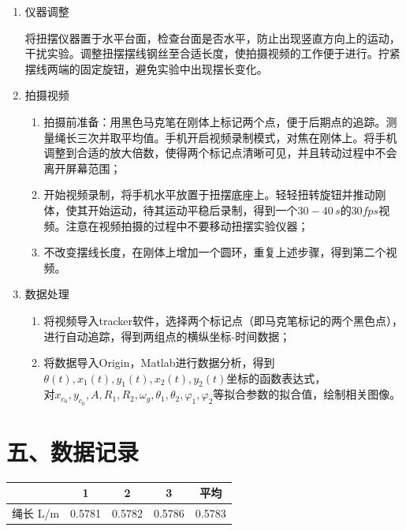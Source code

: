 \documentclass[11pt]{article}
\begin{document}
\begin{enumerate}
    \item 仪器调整
    
    将扭摆仪器置于水平台面，检查台面是否水平，防止出现竖直方向上的运动，干扰实验。调整扭摆摆线钢丝至合适长度，使拍摄视频的工作便于进行。拧紧摆线两端的固定旋钮，避免实验中出现摆长变化。

    \item 拍摄视频
    
    \begin{enumerate}
        \item 拍摄前准备：用黑色马克笔在刚体上标记两个点，便于后期点的追踪。测量绳长三次并取平均值。手机开启视频录制模式，对焦在刚体上。将手机调整到合适的放大倍数，使得两个标记点清晰可见，并且转动过程中不会离开屏幕范围；
        \item 开始视频录制，将手机水平放置于扭摆底座上。轻轻扭转旋钮并推动刚体，使其开始运动，待其运动平稳后录制，得到一个$30-40\,s$的$30fps$视频。注意在视频拍摄的过程中不要移动扭摆实验仪器；
        \item 不改变摆线长度，在刚体上增加一个圆环，重复上述步骤，得到第二个视频。
    \end{enumerate}
    
    \item 数据处理
    
    \begin{enumerate}
        \item 将视频导入tracker软件，选择两个标记点（即马克笔标记的两个黑色点），进行自动追踪，得到两组点的横纵坐标-时间数据；
        \item 将数据导入Origin，Matlab进行数据分析，得到$\theta(t),x_1(t),y_1(t),x_2(t),y_2(t)$坐标的函数表达式，\\
        对$x_{c_0},y_{c_0},A,R_1,R_2,\omega_{g},\theta_1,\theta_2,\varphi_1,\varphi_2$等拟合参数的拟合值，绘制相关图像。
    \end{enumerate}

\end{enumerate}

\section*{五、数据记录}

\begin{tabular}{|c|c|c|c|c|}
    \hline
      & 1   & 2   & 3   & 平均 \\
    \hline
    绳长 L/m & 0.5781 & 0.5782 & 0.5786 & 0.5783 \\
    \hline
\end{tabular}
\end{document}
